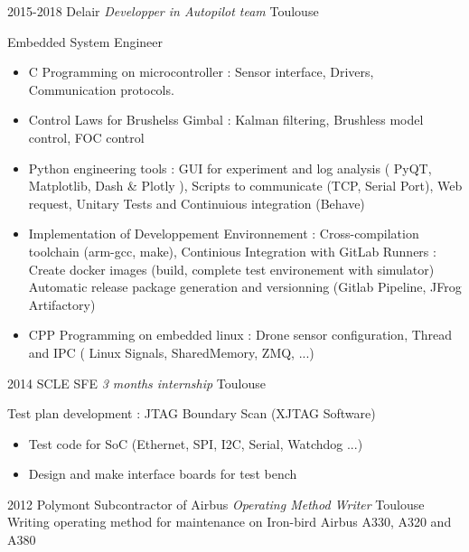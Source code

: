 \documentclass[a4paper]{friggeri-cv} %
\begin{document}
\begin{entrylist}
\entry
{2015-2018}
{Delair \textit{Developper in Autopilot team}}
{Toulouse}
{Embedded System Engineer
\begin{itemize}
\item C Programming on microcontroller : Sensor interface, Drivers, Communication protocols.
\item Control Laws for Brushelss Gimbal : Kalman filtering, Brushless model control, FOC control
\item Python engineering tools : GUI for experiment and log analysis ( PyQT, Matplotlib, Dash \& Plotly ), Scripts to communicate (TCP, Serial Port), Web request, Unitary Tests and Continuious integration (Behave)
\item Implementation of Developpement Environnement : Cross-compilation toolchain (arm-gcc, make), Continious Integration with GitLab Runners : Create docker images (build, complete test environement with simulator) Automatic release package generation and versionning (Gitlab Pipeline, JFrog Artifactory)
\item CPP Programming on embedded linux : Drone sensor configuration, Thread and IPC (  Linux Signals, SharedMemory, ZMQ, ...)
\end{itemize}
%
}
\entry
{2014}
{SCLE SFE \textit{3 months internship}}
{Toulouse}
{Test plan development : JTAG Boundary Scan (XJTAG Software)
\begin{itemize}
\item Test code for SoC (Ethernet, SPI, I2C, Serial, Watchdog ...)
\item Design and make interface boards for test bench
\end{itemize}
}

\entry
{2012}
{Polymont Subcontractor of Airbus \textit{Operating Method Writer}}
{Toulouse}
{ Writing operating method for maintenance on Iron-bird Airbus A330, A320 and A380 }




\end{entrylist}
\end{document}
